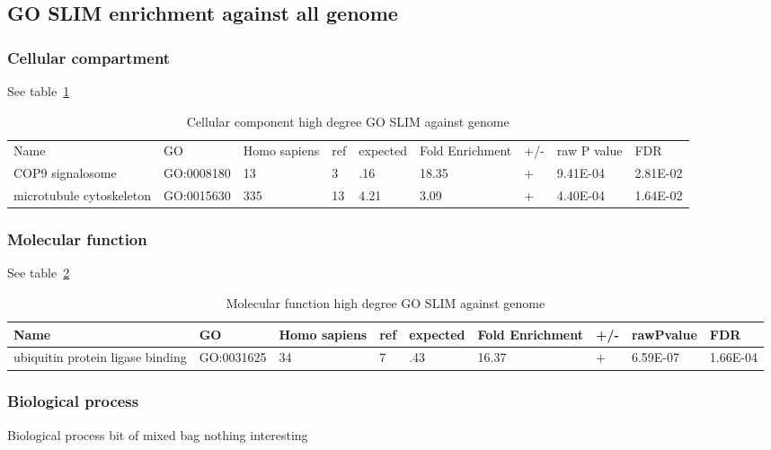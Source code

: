 \subsection{GO SLIM enrichment against all genome} 

\subsubsection{Cellular compartment }
See table~\ref{tab:Cellular component high degree GO SLIM against genome}
\begin{table}
\centering
\begin{adjustbox}{max width=\textwidth}
\begin{tabular}{lllllllll}
  Name & GO&	Homo sapiens &ref &	expected &	Fold Enrichment &	+/-	&raw P value&FDR\\
  COP9 signalosome&GO:0008180&	13&	3&	.16&	18.35&	+&	9.41E-04&	2.81E-02\\
  microtubule cytoskeleton &GO:0015630&	335&	13&	4.21&	3.09&	+&	4.40E-04&	1.64E-02\\
\end{tabular}
\end{adjustbox}
\caption{Cellular component high degree GO SLIM against genome}
\label{tab:Cellular component high degree GO SLIM against genome}
\end{table}

\subsubsection{Molecular function}
See table~\ref{tab:Molecular function high degree GO SLIM against genome} 
\begin{table}
\centering
\begin{adjustbox}{max width=\textwidth}
\begin{tabular}{lllllllll}
  Name & GO&	Homo sapiens &ref &	expected &	Fold Enrichment &	+/-	&rawPvalue&FDR\\
\hline
ubiquitin protein ligase binding&GO:0031625&	34&	7&	.43&	16.37&	+&	6.59E-07&	1.66E-04\\
\end{tabular}
\end{adjustbox}
\caption{Molecular function high degree GO SLIM against genome}
\label{tab:Molecular function high degree GO SLIM against genome}
\end{table}

\subsubsection{Biological process}
Biological process bit of mixed bag nothing interesting 

